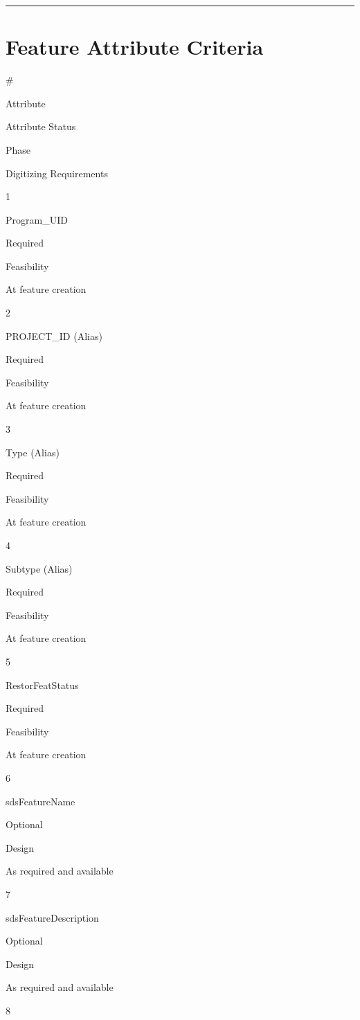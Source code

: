 \documentclass[
  letterpaper,
  DIV=11,
  numbers=noendperiod]{scrreprt}
\begin{document}
\begin{center}\rule{0.5\linewidth}{0.5pt}\end{center}

\section{Feature Attribute Criteria}\label{feature-attribute-criteria-8}

\#

Attribute

Attribute Status

Phase

Digitizing Requirements

1

Program\_UID

Required

Feasibility

At feature creation

2

PROJECT\_ID (Alias)

Required

Feasibility

At feature creation

3

Type (Alias)

Required

Feasibility

At feature creation

4

Subtype (Alias)

Required

Feasibility

At feature creation

5

RestorFeatStatus

Required

Feasibility

At feature creation

6

sdsFeatureName

Optional

Design

As required and available

7

sdsFeatureDescription

Optional

Design

As required and available

8
\end{document}

